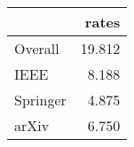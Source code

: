 \begin{tabular}{lr}
\toprule
{} &   rates \\
\midrule
Overall  &  19.812 \\
IEEE     &   8.188 \\
Springer &   4.875 \\
arXiv    &   6.750 \\
\bottomrule
\end{tabular}
